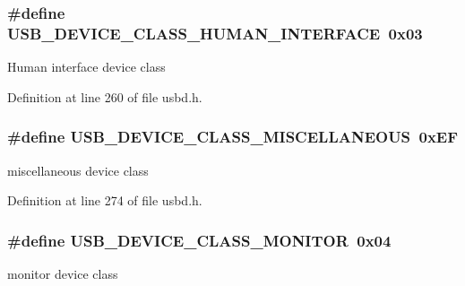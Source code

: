 \subsubsection[{\texorpdfstring{U\+S\+B\+\_\+\+D\+E\+V\+I\+C\+E\+\_\+\+C\+L\+A\+S\+S\+\_\+\+H\+U\+M\+A\+N\+\_\+\+I\+N\+T\+E\+R\+F\+A\+CE}{USB_DEVICE_CLASS_HUMAN_INTERFACE}}]{\setlength{\rightskip}{0pt plus 5cm}\#define U\+S\+B\+\_\+\+D\+E\+V\+I\+C\+E\+\_\+\+C\+L\+A\+S\+S\+\_\+\+H\+U\+M\+A\+N\+\_\+\+I\+N\+T\+E\+R\+F\+A\+CE~0x03}\hypertarget{group__USBD__Core_ga3d9e0560a81b4dfd30bbf829960dbfab}{}\label{group__USBD__Core_ga3d9e0560a81b4dfd30bbf829960dbfab}
Human interface device class 

Definition at line 260 of file usbd.\+h.

\subsubsection[{\texorpdfstring{U\+S\+B\+\_\+\+D\+E\+V\+I\+C\+E\+\_\+\+C\+L\+A\+S\+S\+\_\+\+M\+I\+S\+C\+E\+L\+L\+A\+N\+E\+O\+US}{USB_DEVICE_CLASS_MISCELLANEOUS}}]{\setlength{\rightskip}{0pt plus 5cm}\#define U\+S\+B\+\_\+\+D\+E\+V\+I\+C\+E\+\_\+\+C\+L\+A\+S\+S\+\_\+\+M\+I\+S\+C\+E\+L\+L\+A\+N\+E\+O\+US~0x\+EF}\hypertarget{group__USBD__Core_gabd79da65d7f8f58b37e402fa1442831a}{}\label{group__USBD__Core_gabd79da65d7f8f58b37e402fa1442831a}
miscellaneous device class 

Definition at line 274 of file usbd.\+h.

\subsubsection[{\texorpdfstring{U\+S\+B\+\_\+\+D\+E\+V\+I\+C\+E\+\_\+\+C\+L\+A\+S\+S\+\_\+\+M\+O\+N\+I\+T\+OR}{USB_DEVICE_CLASS_MONITOR}}]{\setlength{\rightskip}{0pt plus 5cm}\#define U\+S\+B\+\_\+\+D\+E\+V\+I\+C\+E\+\_\+\+C\+L\+A\+S\+S\+\_\+\+M\+O\+N\+I\+T\+OR~0x04}\hypertarget{group__USBD__Core_ga23d001aa49fada2019ff3a4886a9f2a5}{}\label{group__USBD__Core_ga23d001aa49fada2019ff3a4886a9f2a5}
monitor device class 

